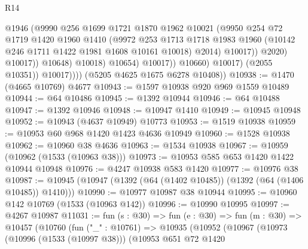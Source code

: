 \begin{lexlean}{R14}
\begin{coremodule}
                                    @1946
                                    (@9990
                                      @256
                                      @1699
                                      @1721
                                      @1870
                                      @1962
                                      @10021
                                      (@9950
                                        @254
                                        @72
                                        @1719
                                        @1420
                                        @1960
                                        @1410
                                        (@9972
                                          @253
                                          @1713
                                          @1718
                                          @1983
                                          @1960
                                          (@10142 @246 @1711 @1422 @1981 @1608 @10161 @10018)
                                          @2014)
                                        @10017))
                                    @2020)
                                  @10017))
                              @10648)
                            @10018)
                          @10654)
                        @10017))
                    @10660)
                  @10017)
                (@2055 @10351))
              @10017))))
      (@5205 @4625 @1675 @6278 @10408))
@10938 := @1470 (@4665 @10769) @4677
@10943 := @1597 @10938 @920 @969 @1559 @10489
@10944 := @64 @10486
@10945 := @1392 @10944
@10946 := @64 @10488
@10947 := @1392 @10946
@10948 := @10947 @1410
@10949 := @10945 @10948
@10952 := @10943 (@4637 @10949) @10773
@10953 := @1519 @10938
@10959 := @10953 @60 @968 @1420 @1423 @4636 @10949
@10960 := @1528 @10938
@10962 := @10960 @38 @4636
@10963 := @1534 @10938
@10967 := @10959 (@10962 (@1533 (@10963 @38)))
@10973 := @10953 @585 @653 @1420 @1422 @10944 @10948
@10976 := @4247 @10938 @583 @1420
@10977 := @10976 @38
@10987 := @10945 (@10947 (@1392 (@64 (@1402 @10485)) (@1392 (@64 (@1406 @10485)) @1410)))
@10990 := @10977 @10987 @38 @10944
@10995 := @10960 @142 @10769 (@1533 (@10963 @142))
@10996 := @10990 @10995
@10997 := @4267 @10987
@11031 := fun (s : @30) =>
  fun (e : @30) =>
  fun (m : @30) =>
  @10457
    (@10760
      (fun ("_" : @10761) =>
      @10935
        (@10952
          (@10967
            (@10973
              (@10996 (@1533 (@10997 @38)))
              (@10953
                @651
                @72
                @1420

\end{coremodule}
\end{lexlean}
